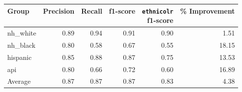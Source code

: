 \begin{tabular}{lrrrrr}
    \toprule
    Group     & Precision & Recall & f1-score & \makecell[rb]{\texttt{ethnicolr}                 \\ f1-score} & \% Improvement \\
    \midrule
    nh\_white & 0.89      & 0.94   & 0.91     & 0.90               & 1.51           \\
    nh\_black & 0.80      & 0.58   & 0.67     & 0.55               & 18.15          \\
    hispanic  & 0.85      & 0.88   & 0.87     & 0.75               & 13.53          \\
    api       & 0.80      & 0.66   & 0.72     & 0.60               & 16.89          \\
    \midrule
    Average       & 0.87      & 0.87   & 0.87     & 0.83               & 4.38           \\
    \bottomrule
\end{tabular}
